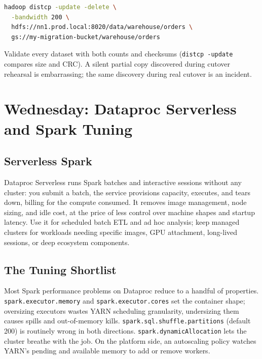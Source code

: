 \begin{lstlisting}[language=bash,caption={Representative distcp from on-premises HDFS to Cloud Storage.}]
hadoop distcp -update -delete \
  -bandwidth 200 \
  hdfs://nn1.prod.local:8020/data/warehouse/orders \
  gs://my-migration-bucket/warehouse/orders
\end{lstlisting}

\begin{notebox}
Validate every dataset with both counts and checksums (\texttt{distcp -update} compares size and CRC). A silent partial copy discovered during cutover rehearsal is embarrassing; the same discovery during real cutover is an incident.
\end{notebox}

\section{Wednesday: Dataproc Serverless and Spark Tuning}

\subsection{Serverless Spark}
Dataproc Serverless runs Spark batches and interactive sessions without any cluster: you submit a batch, the service provisions capacity, executes, and tears down, billing for the compute consumed. It removes image management, node sizing, and idle cost, at the price of less control over machine shapes and startup latency. Use it for scheduled batch ETL and ad hoc analysis; keep managed clusters for workloads needing specific images, GPU attachment, long-lived sessions, or deep ecosystem components.

\subsection{The Tuning Shortlist}
Most Spark performance problems on Dataproc reduce to a handful of properties. \texttt{spark.executor.memory} and \texttt{spark.executor.cores} set the container shape; oversizing executors wastes YARN scheduling granularity, undersizing them causes spills and out-of-memory kills. \texttt{spark.sql.shuffle.partitions} (default 200) is routinely wrong in both directions. \texttt{spark.dynamicAllocation} lets the cluster breathe with the job. On the platform side, an autoscaling policy watches YARN's pending and available memory to add or remove workers.


